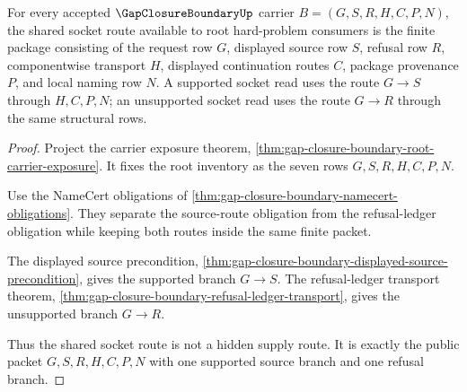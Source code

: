 \begin{theorem}
\label{thm:gap-closure-boundary-shared-socket-route-package}
For every accepted $\GapClosureBoundaryUp$ carrier $B=(G,S,R,H,C,P,N)$, the shared socket route available to root hard-problem consumers is the finite package consisting of the request row $G$, displayed source row $S$, refusal row $R$, componentwise transport $H$, displayed continuation routes $C$, package provenance $P$, and local naming row $N$. A supported socket read uses the route $G \longrightarrow S$ through $H,C,P,N$; an unsupported socket read uses the route $G \longrightarrow R$ through the same structural rows.
\end{theorem}
\begin{proof}
Project the carrier exposure theorem, \autoref{thm:gap-closure-boundary-root-carrier-exposure}. It fixes the root inventory as the seven rows $G,S,R,H,C,P,N$.

Use the NameCert obligations of \autoref{thm:gap-closure-boundary-namecert-obligations}. They separate the source-route obligation from the refusal-ledger obligation while keeping both routes inside the same finite packet.

The displayed source precondition, \autoref{thm:gap-closure-boundary-displayed-source-precondition}, gives the supported branch $G \longrightarrow S$. The refusal-ledger transport theorem, \autoref{thm:gap-closure-boundary-refusal-ledger-transport}, gives the unsupported branch $G \longrightarrow R$.

Thus the shared socket route is not a hidden supply route. It is exactly the public packet $G,S,R,H,C,P,N$ with one supported source branch and one refusal branch.
\end{proof}

